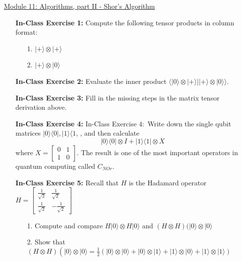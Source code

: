 \documentclass[main.tex]{subfiles}
\begin{document}
\href{https://www2.seas.gwu.edu/~simhaweb/quantum/modules/module11/module11.html}{Module 11: Algorithms, part II - Shor's Algorithm}\\

\begin{enumerate}

\item[] \textbf{In-Class Exercise 1:} Compute the following tensor products in column format:
    \begin{enumerate}
        \item[1.] $|+\rangle \otimes|+\rangle$
        \item[2.] $|+\rangle \otimes|0\rangle$
    \end{enumerate}

\item[] \textbf{In-Class Exercise 2:} Evaluate the inner product $\langle\mid 0\rangle \otimes|+\rangle||+\rangle \otimes|0\rangle\rangle$.

\item[] \textbf{In-Class Exercise 3:} Fill in the missing steps in the matrix tensor derivation above.

\item[] \textbf{In-Class Exercise 4:} In-Class Exercise $4:$ Write down the single qubit matrices $|0\rangle\langle 0|,| 1\rangle\langle 1$, , and then calculate
$$|0\rangle\langle 0|\otimes I+| 1\rangle\langle 1| \otimes X$$
where $X=\left[\begin{array}{ll}0 & 1 \\ 1 & 0\end{array}\right]$. The result is one of the most important operators in quantum computing called $C_{N O r}$.

\item[] \textbf{In-Class Exercise 5:} Recall that $H$ is the Hadamard operator 
$H=\left[\begin{array}{cc}\frac{1}{\sqrt{2}} & \frac{1}{\sqrt{2}} \\ \frac{1}{\sqrt{2}} & -\frac{1}{\sqrt{2}}\end{array}\right]$
\begin{enumerate}
    \item[1.] Compute and compare $H|0\rangle \otimes H|0\rangle$ and $(H \otimes H)(|0\rangle \otimes|0\rangle$
    \item[2.] Show that $(H \otimes H)\left(|0\rangle \otimes|0\rangle=\frac{1}{2}(|0\rangle \otimes|0\rangle+|0\rangle \otimes|1\rangle+|1\rangle \otimes|0\rangle+|1\rangle \otimes|1\rangle)\right.$
\end{enumerate}


\end{enumerate}
\end{document}
